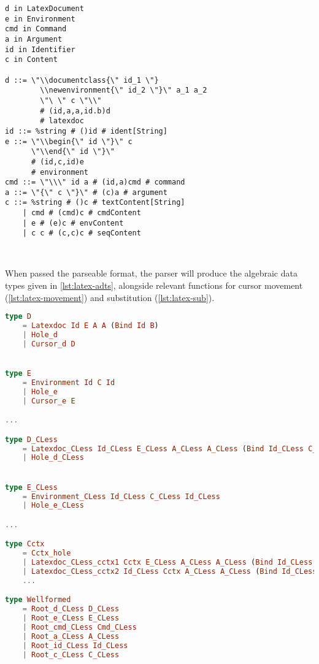 \begin{lstlisting}[style=inline, caption={Parseable format of \LaTeX \ language syntax}, label={lst:latex-bnf}]
d in LatexDocument
e in Environment
cmd in Command
a in Argument
id in Identifier
c in Content

d ::= \"\\documentclass{\" id_1 \"}
        \\newenvironment{\" id_2 \"}\" a_1 a_2 
        \"\ \" c \"\\" 
        # (id,a,a,id.b)d 
        # latexdoc
id ::= %string # ()id # ident[String]
e ::= \"\\begin{\" id \"}\" c 
      \"\\end{\" id \"}\" 
      # (id,c,id)e 
      # environment
cmd ::= \"\\\" id a # (id,a)cmd # command
a ::= \"{\" c \"}\" # (c)a # argument
c ::= %string # ()c # textContent[String] 
    | cmd # (cmd)c # cmdContent 
    | e # (e)c # envContent 
    | c c # (c,c)c # seqContent
    
    
\end{lstlisting}

When passed the parseable format, the parser will produce the algebraic data types
given in \cref{lst:latex-adts}, alongside relevant functions for cursor movement (\cref{lst:latex-movement})
and substitution (\cref{lst:latex-sub}).

\begin{lstlisting}[style=inline, language=elm, caption={Generated ADT for the \LaTeX \ language}, label={lst:latex-adts}]
type D
    = Latexdoc Id E A A (Bind Id B)
    | Hole_d
    | Cursor_d D


type E
    = Environment Id C Id
    | Hole_e
    | Cursor_e E

...

type D_CLess
    = Latexdoc_CLess Id_CLess E_CLess A_CLess A_CLess (Bind Id_CLess C_CLess)
    | Hole_d_CLess


type E_CLess
    = Environment_CLess Id_CLess C_CLess Id_CLess
    | Hole_e_CLess

...

type Cctx
    = Cctx_hole
    | Latexdoc_CLess_cctx1 Cctx E_CLess A_CLess A_CLess (Bind Id_CLess B_CLess)
    | Latexdoc_CLess_cctx2 Id_CLess Cctx A_CLess A_CLess (Bind Id_CLess B_CLess)
    ...

type Wellformed
    = Root_d_CLess D_CLess
    | Root_e_CLess E_CLess
    | Root_cmd_CLess Cmd_CLess
    | Root_a_CLess A_CLess
    | Root_id_CLess Id_CLess
    | Root_c_CLess C_CLess

\end{lstlisting}

